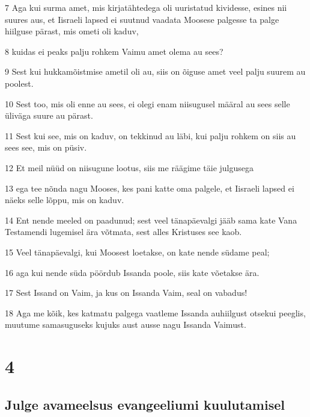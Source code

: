 \par 7 Aga kui surma amet, mis kirjatähtedega oli uuristatud kividesse, esines nii suures aus, et Iisraeli lapsed ei suutnud vaadata Moosese palgesse ta palge hiilguse pärast, mis ometi oli kaduv,
\par 8 kuidas ei peaks palju rohkem Vaimu amet olema au sees?
\par 9 Sest kui hukkamõistmise ametil oli au, siis on õiguse amet veel palju suurem au poolest.
\par 10 Sest too, mis oli enne au sees, ei olegi enam niisugusel määral au sees selle üliväga suure au pärast.
\par 11 Sest kui see, mis on kaduv, on tekkinud au läbi, kui palju rohkem on siis au sees see, mis on püsiv.
\par 12 Et meil nüüd on niisugune lootus, siis me räägime täie julgusega
\par 13 ega tee nõnda nagu Mooses, kes pani katte oma palgele, et Iisraeli lapsed ei näeks selle lõppu, mis on kaduv.
\par 14 Ent nende meeled on paadunud; sest veel tänapäevalgi jääb sama kate Vana Testamendi lugemisel ära võtmata, sest alles Kristuses see kaob.
\par 15 Veel tänapäevalgi, kui Moosest loetakse, on kate nende südame peal;
\par 16 aga kui nende süda pöördub Issanda poole, siis kate võetakse ära.
\par 17 Sest Issand on Vaim, ja kus on Issanda Vaim, seal on vabadus!
\par 18 Aga me kõik, kes katmatu palgega vaatleme Issanda auhiilgust otsekui peeglis, muutume samasuguseks kujuks aust ausse nagu Issanda Vaimust.


\chapter{4}

\section*{Julge avameelsus evangeeliumi kuulutamisel}

